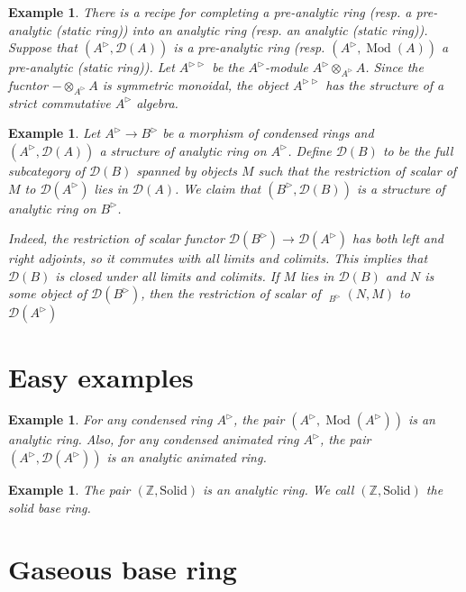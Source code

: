 \documentclass{article}
\theoremstyle{plain}
\newtheorem{exmp}[thm]{Example}
\theoremstyle{definition}
\theoremstyle{remark}
\DeclareMathOperator{\rhoms}{\underline{RHom}}
\DeclareMathOperator{\modcat}{Mod}
\newcommand{\huflag}{\triangleright}
\newcommand{\D}{\mathcal{D}}
\begin{document}
\begin{exmp}
There is a recipe for completing a pre-analytic ring (resp. a pre-analytic (static ring)) into an analytic ring (resp. an analytic (static ring)).
Suppose that $ (A ^{\huflag}, \D (A)) $ is a pre-analytic ring (resp. $ (A ^{\huflag}, \modcat (A)) $ a pre-analytic (static ring)).
Let $ A ^{\huflag\huflag} $ be the $ A ^{\huflag} $-module $ A ^{\huflag} \otimes _{A ^{\huflag}} A $.
Since the fucntor $ -\otimes _{A ^{\huflag}} A $ is symmetric monoidal, the object $ A ^{\huflag\huflag} $ has the structure of
a strict commutative $ A ^{\huflag} $ algebra.
\end{exmp}

\begin{exmp}
Let $ A ^{\huflag}\to B ^{\huflag} $ be a morphism of condensed rings and $ (A ^{\huflag}, \D (A)) $ a structure of analytic ring on $ A ^{\huflag} $.
Define $ \D (B) $ to be the full subcategory of $ \D (B) $ spanned by objects $ M $ such that the restriction of scalar of $ M $ to $ \D (A ^{\huflag}) $
lies in $ \D (A) $. We claim that $ (B ^{\huflag}, \D(B)) $ is a structure of analytic ring on $ B ^{\huflag} $.

Indeed, the restriction of scalar functor $ \D (B ^{\huflag})\to \D (A ^{\huflag}) $ has both left and right adjoints, so it commutes with all limits and colimits.
This implies that $ \D (B) $ is closed under all limits and colimits.
If $ M $ lies in $ \D (B) $ and $ N $ is some object of $ \D (B ^{\huflag}) $,
then the restriction of scalar of $ \rhoms _{B ^{\huflag}}(N, M) $ to $ \D (A ^{\huflag}) $
\end{exmp}

\section{Easy examples}

\begin{exmp}
For any condensed ring $ A ^{\huflag} $, the pair $ (A ^{\huflag}, \modcat (A ^{\huflag})) $ is an analytic ring.
Also, for any condensed animated ring $ A ^{\huflag} $, the pair $ (A ^{\huflag}, \D (A ^{\huflag})) $ is an analytic animated ring.
\end{exmp}

\begin{exmp}
The pair $ (\mathbb{Z}, \mathrm{Solid}) $ is an analytic ring.
We call $ (\mathbb{Z}, \mathrm{Solid}) $ the solid base ring.
\end{exmp}

\section{Gaseous base ring}

\appendix


\printbibliography
\end{document}
